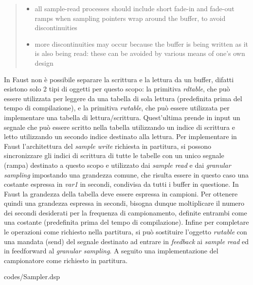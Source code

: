 \begin{quote}
    \begin{itemize}
      \item all sample-read processes 
      should include short fade-in and fade-out
      ramps when sampling pointers wrap around the buffer, to avoid
      discontinuities
      \item more discontinuities may occur because the buffer is being written
      as it is also being read: these can be avoided by various means of
      one's own design
    \end{itemize}
\end{quote}

In Faust non è possibile separare la scrittura e la lettura da un buffer,
difatti esistono solo 2 tipi di oggetti per questo scopo:
la primitiva \textit{rdtable}, che può essere utilizzata per leggere da una tabella di sola lettura 
(predefinita prima del tempo di compilazione),
e la primitiva \textit{rwtable}, che può essere utilizzata per implementare una tabella di lettura/scrittura. 
Quest'ultima prende in input un segnale che può essere scritto nella tabella utilizzando un indice di scrittura e 
letto utilizzando un secondo indice destinato alla lettura.
Per implementare in Faust l'architettura del \textit{sample write} richiesta in partitura, 
si possono sincronizzare gli indici di scrittura di tutte le tabelle con un unico 
segnale (rampa) destinato a questo scopo e utilizzato dai \textit{sample read} e dai \textit{granular sampling} 
impostando una grandezza comune, che risulta essere in questo caso una costante espressa in \textit{var1} in secondi, 
condivisa da tutti i buffer in questione.
In Faust la grandezza della tabella deve essere espressa in campioni. Per ottenere quindi
una grandezza espressa in secondi, bisogna dunque moltiplicare il numero dei secondi desiderati per
la frequenza di campionamento, definite entrambi come una costante (predefinita prima del tempo di compilazione).
Infine per completare le operazioni come richiesto nella partitura, si può sostituire l'oggetto \textit{rwtable}
con una mandata (send) del segnale destinato ad entrare in \emph{feedback} ai \textit{sample read} ed in
feedforward al \textit{granular sampling}.
A seguito una implementazione del campionatore come richiesto in partitura.

\vspace{0.5cm} 

{codes/Sampler.dsp}

